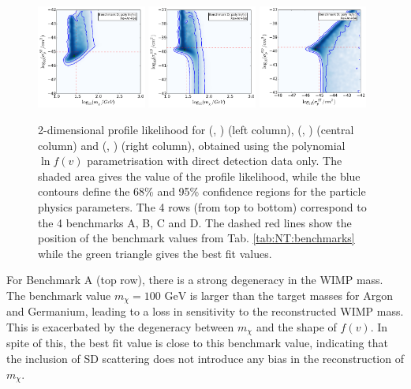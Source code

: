 \begin{figure}[p!]
  \includegraphics[trim=0.2cm 0.2cm 0.2cm 0.2cm, clip,width=0.32\textwidth]{NT/BenchmarkD_poly_noIC-mx_sigsi.pdf}
  \includegraphics[trim=0.2cm 0.2cm 0.2cm 0.2cm, clip,width=0.32\textwidth]{NT/BenchmarkD_poly_noIC-mx_sigsd.pdf}
  \includegraphics[trim=0.2cm 0.2cm 0.2cm 0.2cm, clip,width=0.32\textwidth]{NT/BenchmarkD_poly_noIC-sigsi_sigsd.pdf}
\caption[Reconstructions of the WIMP mass, SI cross section and SD cross section using direct detection data only]{2-dimensional profile likelihood for (\mchi, \sigmapsi) (left column), (\mchi, \sigmapsd) (central column) and (\sigmapsi, \sigmapsd) (right column), obtained using the polynomial $\ln f(v)$ parametrisation with direct detection data only. The shaded area gives the value of the profile likelihood, while the blue contours define the 68\% and 95\% confidence regions for the particle physics parameters. The 4 rows (from top to bottom) correspond to the 4 benchmarks A, B, C and D. The dashed red lines show the position of the benchmark values from Tab. \ref{tab:NT:benchmarks} while the green triangle gives the best fit values.}
\label{fig:NT:withoutIC}
\end{figure}

For Benchmark A (top row), there is a strong degeneracy in the WIMP mass. The benchmark value $m_\chi = 100 \textrm{ GeV}$ is larger than the target masses for Argon and Germanium, leading to a loss in sensitivity to the reconstructed WIMP mass. This is exacerbated by the degeneracy between $m_\chi$ and the shape of $f(v)$.  In spite of this, the best fit value is close to this benchmark value, indicating that the inclusion of SD scattering does not introduce any bias in the reconstruction of $m_\chi$.

